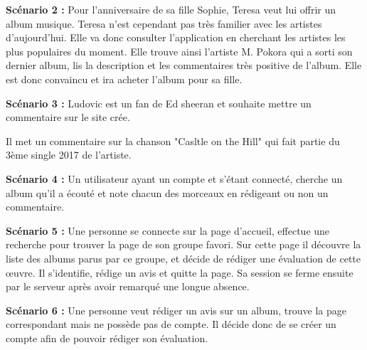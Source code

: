  \begin{paragraphe}
    \textbf{Scénario 2 :}
    Pour l'anniversaire de sa fille Sophie, Teresa veut lui offrir un album
    musique. Teresa n'est cependant pas très familier avec les artistes
    d'aujourd'hui. Elle va donc consulter l'application en cherchant les
    artistes les plus populaires du moment. Elle trouve ainsi l'artiste
    M. Pokora qui a sorti son dernier album, lis la description et les
    commentaires très positive de l'album. Elle est donc convaincu et ira
    acheter l'album pour sa fille.
  \end{paragraphe}

  \begin{paragraphe}
    \textbf{Scénario 3 :}
    Ludovic est un fan de Ed sheeran et souhaite mettre un commentaire sur le
    site crée. \par
    Il met un commentaire sur la chanson "Casltle on the Hill" qui fait partie
    du 3ème single 2017 de l'artiste.
  \end{paragraphe}

  \begin{paragraphe}
    \textbf{Scénario 4 :}
    Un utilisateur ayant un compte et s'étant connecté, cherche un album qu'il
    a écouté et note chacun des morceaux en rédigeant ou non un commentaire.
  \end{paragraphe}

  \begin{paragraphe}
    \textbf{Scénario 5 :}
    Une personne se connecte sur la page d’accueil, effectue une recherche pour
    trouver la page de son groupe favori. Sur cette page il découvre la liste
    des albums parus par ce groupe, et décide de rédiger une évaluation de cette
    œuvre. Il s’identifie, rédige un avis et quitte la page. Sa session se
    ferme ensuite par le serveur après avoir remarqué une longue absence.
  \end{paragraphe}

  \begin{paragraphe}
    \textbf{Scénario 6 :}
    Une personne veut rédiger un avis sur un album, trouve la page
    correspondant mais ne possède pas de compte. Il décide donc de se créer un
    compte afin de pouvoir rédiger son évaluation.
  \end{paragraphe}
